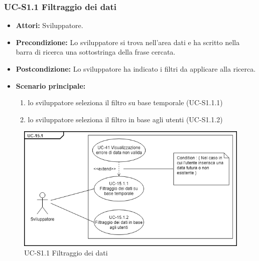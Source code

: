 	\subsubsection{UC-S1.1 Filtraggio dei dati}	
		\begin{itemize}
			\item \textbf{Attori:} Sviluppatore.
			\item \textbf{Precondizione:} Lo sviluppatore si trova nell'area dati e ha scritto nella barra di ricerca una sottostringa della frase cercata.
			\item \textbf{Postcondizione:} Lo sviluppatore ha indicato i filtri da applicare alla ricerca.
			\item \textbf{Scenario principale:}
				\begin{enumerate}
					\item lo sviluppatore seleziona il filtro su base temporale (UC-S1.1.1)
					\item lo sviluppatore seleziona il filtro in base agli utenti (UC-S1.1.2)
				\end{enumerate}
			\end{itemize}
	\begin{figure}[h]
			\centering
			\includegraphics[scale=0.7]{images/UC-15_1.png}
			\caption{UC-S1.1 Filtraggio dei dati}
		\end{figure}	
	
